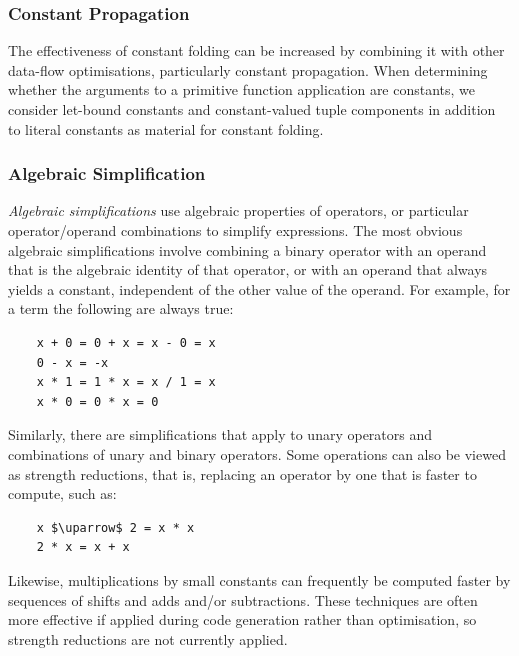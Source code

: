 

\subsubsection{Constant Propagation}

The effectiveness of constant folding can be increased by combining it with
other data-flow optimisations, particularly constant propagation. When
determining whether the arguments to a primitive function application are
constants, we consider let-bound constants and constant-valued tuple components
in addition to literal constants as material for constant folding.


\subsubsection{Algebraic Simplification}

\emph{Algebraic simplifications} use algebraic properties of operators, or
particular operator/operand combinations to simplify expressions. The most
obvious algebraic simplifications involve combining a binary operator with an
operand that is the algebraic identity of that operator, or with an operand that
always yields a constant, independent of the other value of the operand. For
example, for a term  the following are always true:
%
\begin{lstlisting}[style=Haskell,numbers=none]
%\bf$\langle$ algebraic simplification $\rangle$%
    x + 0 = 0 + x = x - 0 = x
    0 - x = -x
    x * 1 = 1 * x = x / 1 = x
    x * 0 = 0 * x = 0
\end{lstlisting}
%
Similarly, there are simplifications that apply to unary operators and
combinations of unary and binary operators. Some operations can also be viewed
as strength reductions, that is, replacing an operator by one that is faster to
compute, such as:
%
\begin{lstlisting}[style=Haskell,numbers=none,mathescape]
%\bf$\langle$ strength reduction $\rangle$%
    x $\uparrow$ 2 = x * x
    2 * x = x + x
\end{lstlisting}
%
Likewise, multiplications by small constants can frequently be computed faster
by sequences of shifts and adds and/or subtractions. These techniques are often
more effective if applied during code generation rather than optimisation, so
strength reductions are not currently applied.


